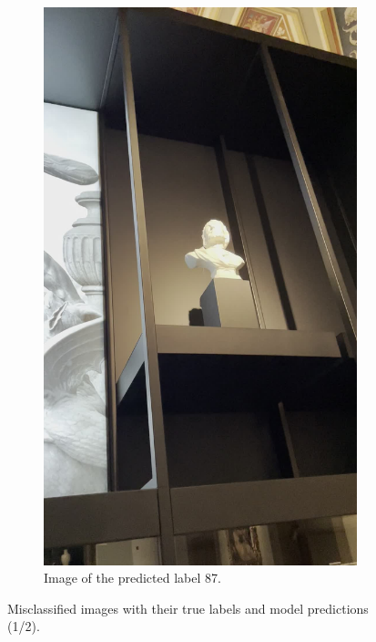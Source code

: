 \begin{figure}[h]
\begin{subfigure}[b]{0.4\textwidth}
        \includegraphics[width=\textwidth]{img/87.jpg}
        \caption{Image of the predicted label 87.}
    \end{subfigure}

    \caption{Misclassified images with their true labels and model predictions (1/2).}\label{fig:misclassifications_examples1}
\end{figure}

